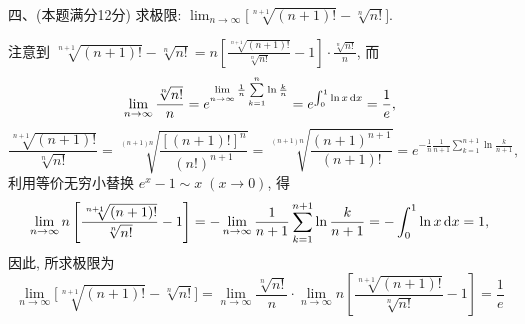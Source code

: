 \documentclass[11pt,twoside]{article} %
\begin{document}
四、(本题满分12分)\;
求极限: $\lim_{n\to\infty}\Big[\sqrt[n+1]{(n+1)!}-\sqrt[n]{n!}\Big]$.\\
\begin{Solution}
注意到 $\sqrt[n+1]{(n+1)!}-\sqrt[n]{n!}=n\left[\frac{\sqrt[n+1]{(n+1)!}}{\sqrt[n]{n!}}-1\right]\cdot\frac{\sqrt[n]{n!}}{n}$, 而
\[\lim_{n\to\infty}\frac{\sqrt[n]{n!}}{n}=e^{\lim\limits_{n\to\infty}\frac{1}{n}\sum\limits_{k=1}^{n}\ln\frac{k}{n}}=e^{\int_0^1\ln x\mathop{}\!\mathrm{d} x}=\frac{1}{e},\]
\[\frac{\sqrt[n+1]{(n+1)!}}{\sqrt[n]{n!}}=\sqrt[(n+1)n]{\frac{[(n+1)!]^n}{(n!)^{n+1}}}=\sqrt[(n+1)n]{\frac{(n+1)^{n+1}}{(n+1)!}}=e^{-\frac{1}{n}\frac{1}{n+1}\sum\limits_{k=1}^{n+1}\ln\frac{k}{n+1}},\]
利用等价无穷小替换 $e^x-1\sim x\;(x\to0)$, 得
\[\lim_{n\to\infty}n\left[\frac{\sqrt[n+1]{(n+1)!}}{\sqrt[n]{n!}}-1\right]=-\lim_{n\to\infty}\frac{1}{n+1}\sum\limits_{k=1}^{n+1}\ln\frac{k}{n+1}=-\int_0^1\ln x\mathop{}\!\mathrm{d} x=1,\]
因此, 所求极限为
\[\lim_{n\to\infty}\Big[\sqrt[n+1]{(n+1)!}-\sqrt[n]{n!}\Big]=\lim_{n\to\infty}\frac{\sqrt[n]{n!}}{n}\cdot\lim_{n\to\infty}n\left[\frac{\sqrt[n+1]{(n+1)!}}{\sqrt[n]{n!}}-1\right]=\frac{1}{e}\]
\end{Solution}
\end{document}
